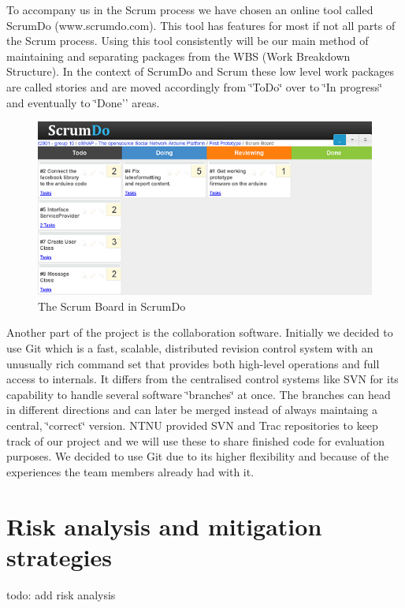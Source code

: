 To accompany us in the Scrum process we have chosen an online tool
called ScrumDo (www.scrumdo.com). This tool has features for most
if not all parts of the Scrum process. Using this tool consistently
	will be our main method of maintaining and separating packages from
	the WBS (Work Breakdown Structure). In the context of ScrumDo and
	Scrum these low level work packages are called stories and are moved
	accordingly from \char`\"{}ToDo\char`\"{} over to \char`\"{}In progress\char`\"{}
	and eventually to \char`\"{}Done'' areas.
	
	\begin{figure}
	\centering \includegraphics{img/management-scrumdo} \caption{The Scrum Board in ScrumDo}
	
	
	\label{fig:management-scrumdo}
	\end{figure}
	
	
	Another part of the project is the collaboration software.
	Initially we decided to use Git which is a fast, scalable,
	distributed revision control system with an unusually rich command
	set that provides both high-level operations and full access to internals.
	It differs from the centralised control systems like SVN for its capability
	to handle several software \char`\"{}branches\char`\"{} at once. The
	branches can head in different directions and can later be merged
	instead of always maintaing a central, \char`\"{}correct\char`\"{}
	version. NTNU provided SVN and Trac repositories to keep track of our
	project and we will use these to share finished code for evaluation
	purposes. We decided to use Git due to its higher flexibility and because
	of the experiences the team members already had with it.

\section{Risk analysis and mitigation strategies}
todo: add risk analysis